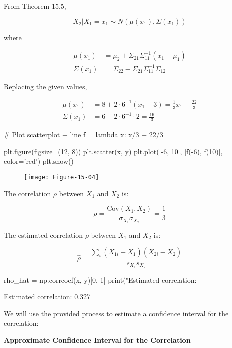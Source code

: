 From Theorem 15.5,

\[ X_{2} | X_{1} = x_{1} \sim N(\mu(x_{1}), \Sigma(x_{1}))\]

where

\begin{align*}
\mu(x_{1}) &= \mu_{2} + \Sigma_{21} \Sigma_{11}^{-1} (x_{1} - \mu_{1}) \\
\Sigma(x_{1}) &= \Sigma_{22} - \Sigma_{21}\Sigma_{11}^{-1}\Sigma_{12}
\end{align*}

Replacing the given values,

\begin{align*}
\mu(x_{1}) &= 8 + 2 \cdot 6^{-1} (x_{1} - 3) = \frac{1}{3} x_{1} + \frac{22}{3}\\
\Sigma(x_{1}) &= 6 - 2 \cdot 6^{-1} \cdot 2 = \frac{16}{3}
\end{align*}

\begin{python}
# Plot scatterplot + line
f = lambda x: x/3 + 22/3

plt.figure(figsize=(12, 8))
plt.scatter(x, y)
plt.plot([-6, 10], [f(-6), f(10)], color='red')
plt.show()
\end{python}

\begin{figure}[H]
\centering
\texttt{[image: Figure-15-04]}
\end{figure}

The correlation \(\rho\) between \(X_{1}\) and \(X_{2}\) is:

\[ \rho = \frac{\text{Cov}(X_{1}, X_{2})}{\sigma_{X_{1}} \sigma_{X_{2}}} = \frac{1}{3}\]

The estimated correlation \(\rho\) between \(X_{1}\) and \(X_{2}\) is:

\[ \hat{\rho} = \frac{\sum_{i} (X_{1i} - \overline{X}_{1})(X_{2i} - \overline{X}_{2})}{s_{X_{1}} s_{X_{2}}}\]

\begin{python}
rho_hat = np.corrcoef(x, y)[0, 1]
print("Estimated correlation: %
\end{python}

\begin{console}
Estimated correlation: 0.327
\end{console}

We will use the provided process to estimate a confidence interval for
the correlation:

\textbf{Approximate Confidence Interval for the Correlation}

